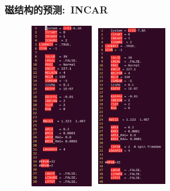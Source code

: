 \documentclass[cjk,slidestop,compress,mathserif,blue]{beamer}
\begin{document}
\frame
{
	\frametitle{\textrm{}磁结构的预测:~\textrm{INCAR}}
\begin{figure}[h!]
\vspace*{-0.11in}
\centering
\includegraphics[height=2.85in,width=1.20in]{Figures/MagGene-CrI3-6.3-INCAR.png}
\hskip 0.3in
\includegraphics[height=2.85in,width=1.20in]{Figures/MagGene-CrI3-7.0-INCAR.png}
\label{Fig:CrI3-INCAR}
\end{figure}
}
\end{document}
